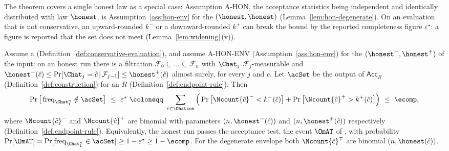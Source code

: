 
The theorem covers a single honest law as a special case: Assumption A-HON,
the acceptance statistics being independent and identically distributed with
law $\honest$, is Assumption~\ref{ass:hon-env} for the
 $(\honest,\honest)$
(Lemma~\ref{lem:hon-degenerate}). On an evaluation that is not conservative,
an upward-rounded $k^{-}$ or a downward-rounded $k^{+}$ can break the bound by
the reported completeness figure $\varepsilon^{\star}$: a figure is reported
that the set does not meet (Lemma~\ref{lem:widening}\,(v)).

\begin{theorem}\label{thm:completeness-bound}
Assume a 
(Definition~\ref{def:conservative-evaluation}), and assume A-HON-ENV
(Assumption~\ref{ass:hon-env}) for the
 $({\honest}^{-},{\honest}^{+})$ of the input: on an
honest run there is a filtration
$\mathcal{F}_0\subseteq\dots\subseteq\mathcal{F}_n$ with $\Chat_j$
$\mathcal{F}_j$-measurable and
${\honest}^{-}(\hat c)\le\Pr[\Chat_j=\hat c\,|\,\mathcal{F}_{j-1}]\le
{\honest}^{+}(\hat c)$ almost surely, for every $j$ and $\hat c$. Let
$\acSet$ be the output of $\mathsf{Acc}_R$
(Definition~\ref{def:construction}) for an 
$R$ (Definition~\ref{def:endpoint-rule}). Then
\begin{equation}\label{eq:completeness}
  \Pr\big[\operatorname{freq}_{\Chat_1^n}\notin\acSet\big]
  \ \le\ \varepsilon^{\star}
  \ \coloneqq\ \sum_{\hat c\in\Chatcon}
  \Big(\Pr\big[\Ncount{\hat c}^{-}<k^{-}(\hat c)\big]
      +\Pr\big[\Ncount{\hat c}^{+}>k^{+}(\hat c)\big]\Big)
  \ \le\ \ecomp ,
\end{equation}
where $\Ncount{\hat c}^{-}$ and $\Ncount{\hat c}^{+}$ are binomial with
parameters $(n,{\honest}^{-}(\hat c))$ and $(n,{\honest}^{+}(\hat c))$
respectively (Definition~\ref{def:endpoint-rule}). Equivalently, the honest
run passes the acceptance test, the event $\OmAT$ of
, with probability
$\Pr[\OmAT]=\Pr[\operatorname{freq}_{\Chat_1^n}\in\acSet]
\ge1-\varepsilon^{\star}\ge1-\ecomp$. For the degenerate envelope both
$\Ncount{\hat c}^{\mp}$ are binomial $(n,\honest(\hat c))$.
\end{theorem}

